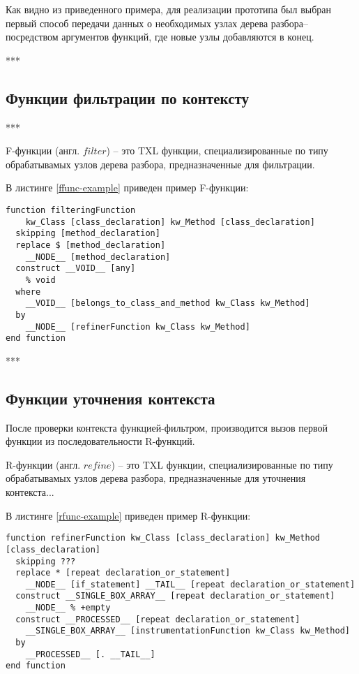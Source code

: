 Как видно из приведенного примера, для реализации прототипа был выбран первый способ передачи данных о необходимых узлах дерева разбора-- посредством аргументов функций, где новые узлы добавляются в конец.

***

\subsection{Функции фильтрации по контексту}

***

F-функции (англ. $filter$) -- это TXL функции, специализированные по типу обрабатывамых узлов дерева разбора, предназначенные для фильтрации.

В листинге \ref{ffunc-example} приведен пример F-функции:

\begin{lstlisting}[language=TXL, label={ffunc-example}, caption={Пример F-функции}]
function filteringFunction
    kw_Class [class_declaration] kw_Method [class_declaration]
  skipping [method_declaration]
  replace $ [method_declaration]
    __NODE__ [method_declaration]
  construct __VOID__ [any]
    % void
  where
    __VOID__ [belongs_to_class_and_method kw_Class kw_Method]
  by
    __NODE__ [refinerFunction kw_Class kw_Method]
end function
\end{lstlisting}

***

\subsection{Функции уточнения контекста}

После проверки контекста функцией-фильтром, производится вызов первой функции из последовательности R-функций.

R-функции (англ. $refine$) -- это TXL функции, специализированные по типу обрабатывамых узлов дерева разбора, предназначенные для уточнения контекста...

В листинге \ref{rfunc-example} приведен пример R-функции:

\begin{lstlisting}[frame=single, language=TXL, label={rfunc-example}, caption={Пример R-функции}]
function refinerFunction kw_Class [class_declaration] kw_Method [class_declaration]
  skipping ???
  replace * [repeat declaration_or_statement]
    __NODE__ [if_statement] __TAIL__ [repeat declaration_or_statement]
  construct __SINGLE_BOX_ARRAY__ [repeat declaration_or_statement]
    __NODE__ % +empty
  construct __PROCESSED__ [repeat declaration_or_statement]
    __SINGLE_BOX_ARRAY__ [instrumentationFunction kw_Class kw_Method]
  by
    __PROCESSED__ [. __TAIL__]
end function
\end{lstlisting}

